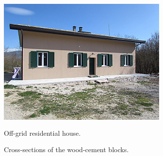 \begin{figure}[t!]
	\begin{center}
		\includegraphics[width=20pc]{figures/Vista_sud.eps}
		\caption{Off-grid residential house.}
		\captionsetup{justification=centering}
		\label{F:house}
	\end{center}
\end{figure}
\begin{figure}[h!]
	\begin{center}
	\end{center}
	\vspace{-0.5cm}
	\caption{Cross-sections of the wood-cement blocks.}
	\captionsetup{justification=centering}
	\label{F:houseSection}
\end{figure}
